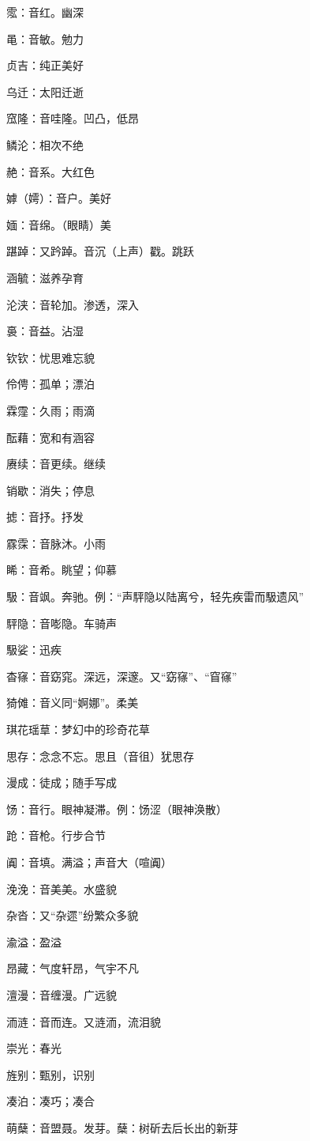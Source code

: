 霐：音红。幽深

黾：音敏。勉力

贞吉：纯正美好

乌迁：太阳迁逝

窊隆：音哇隆。凹凸，低昂

鳞沦：相次不绝

赩：音系。大红色

嫭（嫮）：音户。美好

媔：音绵。（眼睛）美

踸踔：又趻踔。音沉（上声）戳。跳跃

涵毓：滋养孕育

沦浃：音轮加。渗透，深入

裛：音益。沾湿

钦钦：忧思难忘貌

伶俜：孤单；漂泊

霖霪：久雨；雨滴

酝藉：宽和有涵容

赓续：音更续。继续

销歇：消失；停息

摅：音抒。抒发

霡霂：音脉沐。小雨

睎：音希。眺望；仰慕

馺：音飒。奔驰。例：“声駍隐以陆离兮，轻先疾雷而馺遗风”

駍隐：音嘭隐。车骑声

馺娑：迅疾

杳窱：音窈窕。深远，深邃。又“窈窱”、“窅窱”

猗傩：音义同“婀娜”。柔美

琪花瑶䓍：梦幻中的珍奇花草

思存：念念不忘。思且（音徂）犹思存

漫成：徒成；随手写成

饧：音行。眼神凝滞。例：饧涩（眼神涣散）

跄：音枪。行步合节

阗：音填。满溢；声音大（喧阗）

浼浼：音美美。水盛貌

杂沓：又“杂遝”纷繁众多貌

渝溢：盈溢

昂藏：气度轩昂，气宇不凡

澶漫：音缠漫。广远貌

洏涟：音而连。又涟洏，流泪貌

崇光：春光

旌别：甄别，识别

凑泊：凑巧；凑合

萌蘖：音盟聂。发芽。蘖：树斫去后长出的新芽

\newpage